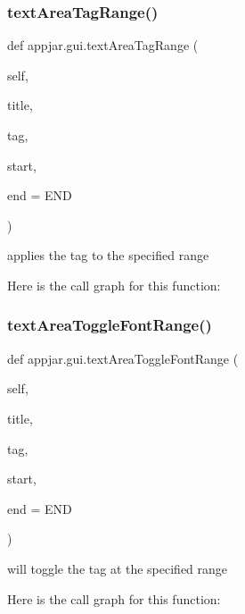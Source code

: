 \begin{DoxyVerb}
\subsubsection{\texorpdfstring{text\+Area\+Tag\+Range()}{textAreaTagRange()}}
{\footnotesize\ttfamily def appjar.\+gui.\+text\+Area\+Tag\+Range (\begin{DoxyParamCaption}\item[{}]{self,  }\item[{}]{title,  }\item[{}]{tag,  }\item[{}]{start,  }\item[{}]{end = {\ttfamily END} }\end{DoxyParamCaption})}

\begin{DoxyVerb}applies the tag to the specified range \end{DoxyVerb}
 Here is the call graph for this function\+:
\mbox{\label{classappjar_1_1gui_a23923fa499597c3ca3279688a31348b7}} 
\subsubsection{\texorpdfstring{text\+Area\+Toggle\+Font\+Range()}{textAreaToggleFontRange()}}
{\footnotesize\ttfamily def appjar.\+gui.\+text\+Area\+Toggle\+Font\+Range (\begin{DoxyParamCaption}\item[{}]{self,  }\item[{}]{title,  }\item[{}]{tag,  }\item[{}]{start,  }\item[{}]{end = {\ttfamily END} }\end{DoxyParamCaption})}

\begin{DoxyVerb}will toggle the tag at the specified range \end{DoxyVerb}
 Here is the call graph for this function\+:
\mbox{\label{classappjar_1_1gui_a25b1227fc3d2c725228793a71ce958dd}} 

\end{DoxyVerb}
